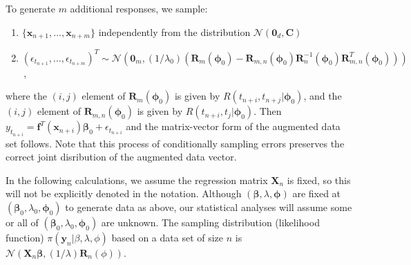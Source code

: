 \documentclass[11pt, oneside]{article}   	%
\begin{document}
To generate $m$ additional responses, we sample:
\begin{enumerate}
\item $\{ \mathbf{x}_{n+1}, \ldots, \mathbf{x}_{n+m} \}$ independently from the distribution $\mathcal{N}( \mathbf{0}_d, \mathbf{C})$
\item $(\epsilon_{t_{n+1}}, \ldots, \epsilon_{t_{n+m}})^T \sim \mathcal{N} \left( \mathbf{0}_m, (1/\lambda_0) \left(\mathbf{R}_m (\mathbf{\phi}_0) - \mathbf{R}_{m,n} (\mathbf{\phi}_0) \mathbf{R}_n^{-1} (\mathbf{\phi}_0) \mathbf{R}_{m,n}^T (\mathbf{\phi}_0) \right) \right)$ \,,
\end{enumerate}
where the $(i,j)$ element of $\mathbf{R}_m(\mathbf{\phi}_0)$ is given by $R(t_{n+i}, t_{n+j} | \mathbf{\phi}_0)$, and the $(i,j)$ element of $\mathbf{R}_{m,n} (\mathbf{\phi}_0)$ is given by $R(t_{n+i}, t_j | \mathbf{\phi}_0)$. Then $y_{t_{n+i}} = \mathbf{f}^T(\mathbf{x}_{n+i}) \mathbf{\beta}_0 + \epsilon_{t_{n+i}}$ and the matrix-vector form of the augmented data set follows.  Note that this process of conditionally sampling errors preserves the correct joint disribution of the augmented data vector.

In the following calculations, we assume the regression matrix $\mathbf{X}_n$ is fixed, so this will not be explicitly denoted in the notation.  Although $(\mathbf{\beta}, \lambda, \mathbf{\phi})$ are fixed at $(\mathbf{\beta}_0, \lambda_0, \mathbf{\phi}_0)$ to generate data as above, our statistical analyses will assume some or all of $(\mathbf{\beta}_0, \lambda_0, \mathbf{\phi}_0)$ are unknown.  The sampling distribution (likelihood function) $\pi(\mathbf{y}_n | \beta, \lambda, \phi)$ based on a data set of size $n$ is $\mathcal{N} \left( \mathbf{X}_n \mathbf{\beta}, (1/\lambda) \mathbf{R}_n (\phi) \right)$.
\end{document}
